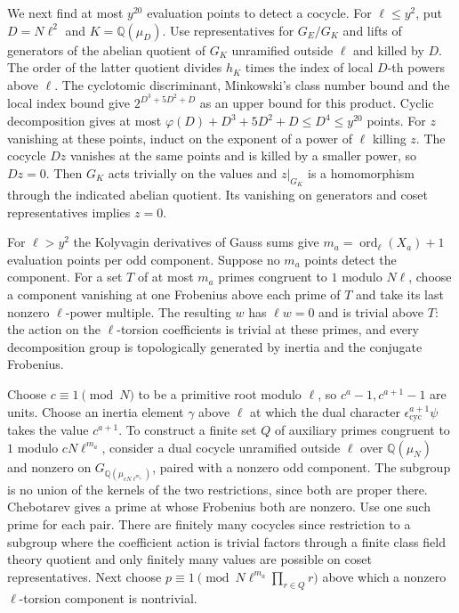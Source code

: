 We next find at most \(y^{20}\) evaluation points to detect a cocycle.
For \(\ell\le y^2\), put \(D=N\ell^2\) and \(K=\mathbb Q(\mu_D)\).
Use representatives for \(G_E/G_K\) and lifts of generators of the abelian quotient of \(G_K\)
unramified outside \(\ell\) and killed by \(D\).
The order of the latter quotient divides \(h_K\) times the index of local \(D\)-th powers above
\(\ell\). The cyclotomic discriminant, Minkowski's class number bound and the local index bound
give \(2^{D^3+5D^2+D}\) as an upper bound for this product.
Cyclic decomposition gives at most \(\varphi(D)+D^3+5D^2+D\le D^4\le y^{20}\) points.
For \(z\) vanishing at these points, induct on the exponent of a power of \(\ell\) killing \(z\).
The cocycle \(Dz\) vanishes at the same points and is killed by a smaller power, so \(Dz=0\).
Then \(G_K\) acts trivially on the values and \(z|_{G_K}\) is a homomorphism through the indicated
abelian quotient. Its vanishing on generators and coset representatives implies \(z=0\).

For \(\ell>y^2\) the Kolyvagin derivatives of Gauss sums give
\(m_a=\operatorname{ord}_\ell(X_a)+1\) evaluation points per odd component.
Suppose no \(m_a\) points detect the component. For a set \(T\) of at most \(m_a\) primes congruent
to \(1\) modulo \(N\ell\), choose a component vanishing at one Frobenius above each prime of \(T\)
and take its last nonzero \(\ell\)-power multiple. The resulting \(w\) has \(\ell w=0\) and
is trivial above \(T\): the action on the \(\ell\)-torsion coefficients is trivial at these primes,
and every decomposition group is topologically generated by inertia and the conjugate Frobenius.

Choose \(c\equiv1\pmod N\) to be a primitive root modulo \(\ell\), so \(c^a-1,c^{a+1}-1\) are units.
Choose an inertia element \(\gamma\) above \(\ell\) at which the dual character
\(\epsilon_{\mathrm{cyc}}^{a+1}\psi\) takes the value \(c^{a+1}\).
To construct a finite set \(Q\) of auxiliary primes congruent to \(1\) modulo \(cN\ell^{m_a}\),
consider a dual cocycle unramified outside \(\ell\) over \(\mathbb Q(\mu_N)\) and nonzero on
\(G_{\mathbb Q(\mu_{cN\ell^{m_a}})}\), paired with a nonzero odd component. The subgroup is no
union of the kernels of the two restrictions, since both are proper there.
Chebotarev gives a prime at whose Frobenius both are nonzero. Use one such prime for each pair.
There are finitely many cocycles since restriction to a subgroup where the coefficient action is
trivial factors through a finite class field theory quotient and only finitely many values
are possible on coset representatives. Next choose \(p\equiv1\pmod {N\ell^{m_a}\prod_{r\in Q}r}\)
above which a nonzero \(\ell\)-torsion component is nontrivial.

